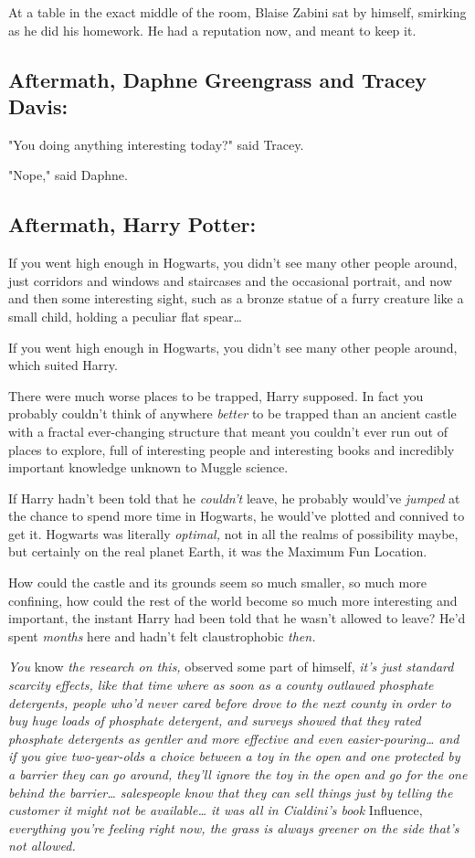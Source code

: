 At a table in the exact middle of the room, Blaise Zabini sat by himself, 
smirking as he did his homework. He had a reputation now, and meant to keep it.
\sbreak
\subsection{Aftermath, Daphne Greengrass and Tracey Davis:}

"You doing anything interesting today?" said Tracey.

"Nope," said Daphne.
\sbreak
\subsection{Aftermath, Harry Potter:}

If you went high enough in Hogwarts, you didn't see many other people around, 
just corridors and windows and staircases and the occasional portrait, and now 
and then some interesting sight, such as a bronze statue of a furry creature 
like a small child, holding a peculiar flat spear{\ldots}

If you went high enough in Hogwarts, you didn't see many other people around, 
which suited Harry.

There were much worse places to be trapped, Harry supposed. In fact you 
probably couldn't think of anywhere \emph{better} to be trapped than an ancient 
castle with a fractal ever-changing structure that meant you couldn't ever run 
out of places to explore, full of interesting people and interesting books and 
incredibly important knowledge unknown to Muggle science.

If Harry hadn't been told that he \emph{couldn't} leave, he probably would've 
\emph{jumped} at the chance to spend more time in Hogwarts, he would've plotted 
and connived to get it. Hogwarts was literally \emph{optimal,} not in all the 
realms of possibility maybe, but certainly on the real planet Earth, it was the 
Maximum Fun Location.

How could the castle and its grounds seem so much smaller, so much more 
confining, how could the rest of the world become so much more interesting and 
important, the instant Harry had been told that he wasn't allowed to leave? 
He'd spent \emph{months} here and hadn't felt claustrophobic \emph{then.}

\emph{You} know\emph{ the research on this,} observed some part of himself, 
\emph{it's just standard scarcity effects, like that time where as soon as a 
county outlawed phosphate detergents, people who'd never cared before drove to 
the next county in order to buy huge loads of phosphate detergent, and surveys 
showed that they rated phosphate detergents as gentler and more effective and 
even easier-pouring{\ldots} and if you give two-year-olds a choice between a 
toy in the open and one protected by a barrier they can go around, they'll 
ignore the toy in the open and go for the one behind the barrier{\ldots} 
salespeople know that they can sell things just by telling the customer it 
might not be available{\ldots} it was all in Cialdini's book} Influence,\emph{ 
everything you're feeling right now, the grass is always greener on the side 
that's not allowed.}

